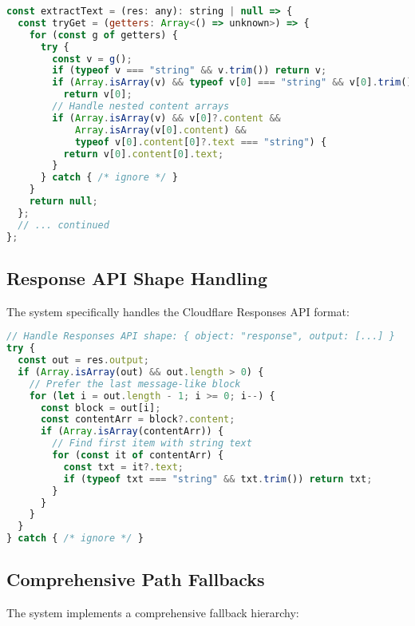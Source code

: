\documentclass[11pt,a4paper]{article}
\begin{document}
\begin{lstlisting}[language=JavaScript, caption=Multi-Path Extraction Strategy]
const extractText = (res: any): string | null => {
  const tryGet = (getters: Array<() => unknown>) => {
    for (const g of getters) {
      try {
        const v = g();
        if (typeof v === "string" && v.trim()) return v;
        if (Array.isArray(v) && typeof v[0] === "string" && v[0].trim()) 
          return v[0];
        // Handle nested content arrays
        if (Array.isArray(v) && v[0]?.content && 
            Array.isArray(v[0].content) && 
            typeof v[0].content[0]?.text === "string") {
          return v[0].content[0].text;
        }
      } catch { /* ignore */ }
    }
    return null;
  };
  // ... continued
};
\end{lstlisting}

\subsection{Response API Shape Handling}

The system specifically handles the Cloudflare Responses API format:

\begin{lstlisting}[language=JavaScript, caption=Responses API Shape Handler]
// Handle Responses API shape: { object: "response", output: [...] }
try {
  const out = res.output;
  if (Array.isArray(out) && out.length > 0) {
    // Prefer the last message-like block
    for (let i = out.length - 1; i >= 0; i--) {
      const block = out[i];
      const contentArr = block?.content;
      if (Array.isArray(contentArr)) {
        // Find first item with string text
        for (const it of contentArr) {
          const txt = it?.text;
          if (typeof txt === "string" && txt.trim()) return txt;
        }
      }
    }
  }
} catch { /* ignore */ }
\end{lstlisting}

\subsection{Comprehensive Path Fallbacks}

The system implements a comprehensive fallback hierarchy:
\end{document}

